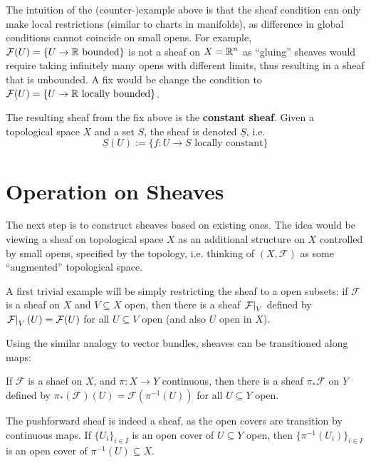\documentclass{article}
\begin{document}
\nogap
\begin{remark}
    The intuition of the (counter-)example above is that the sheaf condition can only make local restrictions (similar to charts in manifolds), as difference in global conditions cannot coincide on small opens. For example, $\mathcal{F}(U) = \{ U \to \mathbb{R} \text{ bounded} \}$ is not a sheaf on $X = \mathbb{R}^n$ as ``gluing'' sheaves would require taking infinitely many opens with different limits, thus resulting in a sheaf that is unbounded. A fix would be change the condition to $\mathcal{F}(U) = \{ U \to \mathbb{R} \text{ locally bounded} \}$.
\end{remark}

\begin{definition}
    The resulting sheaf from the fix above is the \textbf{constant sheaf}. Given a topological space $X$ and a set $S$, the sheaf is denoted $\underline{S}$, i.e.
    \[
        \underline{S}(U) := \{ f: U \to S \text{ locally constant} \}
    \]
\end{definition}

\section{Operation on Sheaves}

\textstart
The next step is to construct sheaves based on existing ones. The idea would be viewing a sheaf on topological space $X$ as an additional structure on $X$ controlled by small opens, specified by the topology, i.e. thinking of $(X, \mathcal{F})$ as some ``augmented'' topological space.

A first trivial example will be simply restricting the sheaf to a open subsets: if $\mathcal{F}$ is a sheaf on $X$ and $V \subseteq X$ open, then there is a sheaf $\left.\mathcal{F}\right|_{V}$ defined by $\left.\mathcal{F}\right|_{V}(U) = \mathcal{F}(U)$ for all $U \subseteq V$ open (and also $U$ open in $X$).

Using the similar analogy to vector bundles, sheaves can be transitioned along maps:

\begin{definition}
    If $\mathcal{F}$ is a shaef on $X$, and $\pi: X \to Y$ continuous, then there is a sheaf $\pi_{\ast}\mathcal{F}$ on $Y$ defined by $\pi_{\ast}(\mathcal{F})(U) = \mathcal{F}(\pi^{-1}(U))$ for all $U \subseteq Y$ open.
\end{definition}
\nogap
\begin{remark}
    The pushforward sheaf is indeed a sheaf, as the open covers are transition by continuous maps. If $\{ U_i \}_{i \in I}$ is an open cover of $U \subseteq Y$ open, then $\{ \pi^{-1}(U_i) \}_{i \in I}$ is an open cover of $\pi^{-1}(U) \subseteq X$.
\end{remark}
\end{document}
